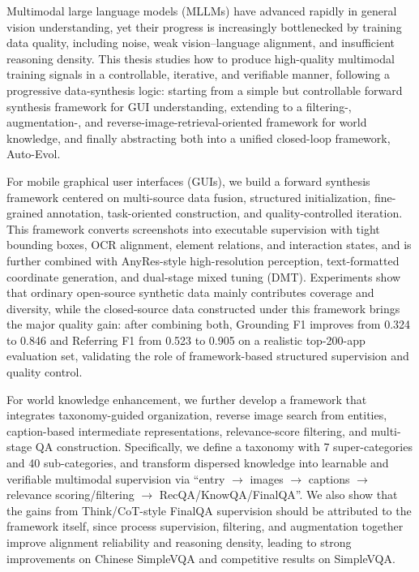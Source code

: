 \documentclass[type=master, twoside]{fduthesis}
\begin{document}
\begin{abstract*}

Multimodal large language models (MLLMs) have advanced rapidly in general vision understanding, yet their progress is increasingly bottlenecked by training data quality, including noise, weak vision--language alignment, and insufficient reasoning density. This thesis studies how to produce high-quality multimodal training signals in a controllable, iterative, and verifiable manner, following a progressive data-synthesis logic: starting from a simple but controllable forward synthesis framework for GUI understanding, extending to a filtering-, augmentation-, and reverse-image-retrieval-oriented framework for world knowledge, and finally abstracting both into a unified closed-loop framework, Auto-Evol.

For mobile graphical user interfaces (GUIs), we build a forward synthesis framework centered on multi-source data fusion, structured initialization, fine-grained annotation, task-oriented construction, and quality-controlled iteration. This framework converts screenshots into executable supervision with tight bounding boxes, OCR alignment, element relations, and interaction states, and is further combined with AnyRes-style high-resolution perception, text-formatted coordinate generation, and dual-stage mixed tuning (DMT). Experiments show that ordinary open-source synthetic data mainly contributes coverage and diversity, while the closed-source data constructed under this framework brings the major quality gain: after combining both, Grounding F1 improves from 0.324 to 0.846 and Referring F1 from 0.523 to 0.905 on a realistic top-200-app evaluation set, validating the role of framework-based structured supervision and quality control.

For world knowledge enhancement, we further develop a framework that integrates taxonomy-guided organization, reverse image search from entities, caption-based intermediate representations, relevance-score filtering, and multi-stage QA construction. Specifically, we define a taxonomy with 7 super-categories and 40 sub-categories, and transform dispersed knowledge into learnable and verifiable multimodal supervision via “entry $\rightarrow$ images $\rightarrow$ captions $\rightarrow$ relevance scoring/filtering $\rightarrow$ RecQA/KnowQA/FinalQA”. We also show that the gains from Think/CoT-style FinalQA supervision should be attributed to the framework itself, since process supervision, filtering, and augmentation together improve alignment reliability and reasoning density, leading to strong improvements on Chinese SimpleVQA and competitive results on SimpleVQA.


\end{abstract*}
\end{document}
